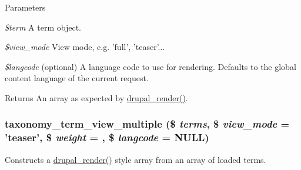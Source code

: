 \begin{DoxyParams}{Parameters}
\item[{\em \$term}]A term object. \item[{\em \$view\_\-mode}]View mode, e.g. 'full', 'teaser'... \item[{\em \$langcode}](optional) A language code to use for rendering. Defaults to the global content language of the current request.\end{DoxyParams}
\begin{DoxyReturn}{Returns}
An array as expected by \hyperlink{common_8inc_a05798b44e8d6c496d4bee5cc32fa7851}{drupal\_\-render()}. 
\end{DoxyReturn}
\hypertarget{taxonomy_8module_aed779b4362d1a9002f18ed334254de66}{
\subsubsection[{taxonomy\_\-term\_\-view\_\-multiple}]{\setlength{\rightskip}{0pt plus 5cm}taxonomy\_\-term\_\-view\_\-multiple (\$ {\em terms}, \/  \$ {\em view\_\-mode} = {\ttfamily 'teaser'}, \/  \$ {\em weight} = {}, \/  \$ {\em langcode} = {\ttfamily NULL})}}
\label{taxonomy_8module_aed779b4362d1a9002f18ed334254de66}
Constructs a \hyperlink{common_8inc_a05798b44e8d6c496d4bee5cc32fa7851}{drupal\_\-render()} style array from an array of loaded terms.


